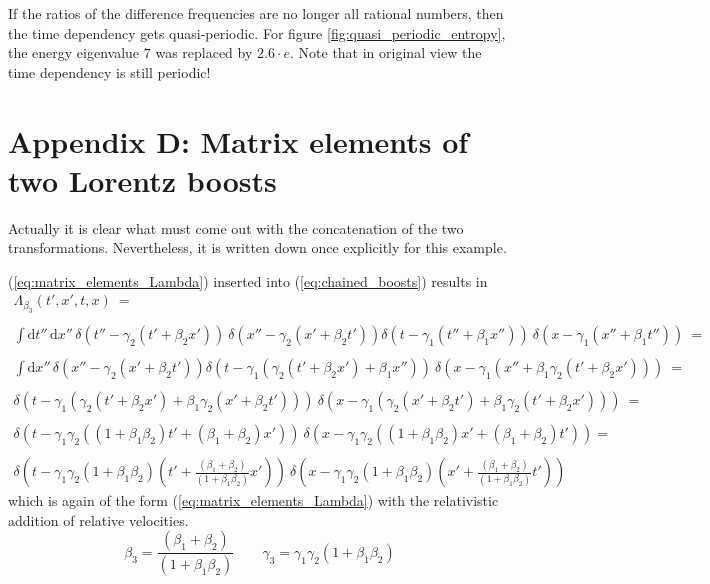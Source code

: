 \documentclass[12pt]{article}
\begin{document}
If the ratios of the difference frequencies are no longer all rational numbers, then the time dependency gets quasi-periodic. For figure \ref{fig:quasi_periodic_entropy}, the energy eigenvalue $7$ was replaced by $2.6 \cdot e$. Note that in original view the time dependency is still periodic!

\newpage
\section{Appendix D: Matrix elements of two Lorentz boosts}

Actually it is clear what must come out with the concatenation of the two transformations. Nevertheless, it is written down once explicitly for this example.

(\ref{eq:matrix_elements_Lambda}) inserted into (\ref{eq:chained_boosts}) results in
\begin{equation*}
\begin{gathered}
\Lambda_{\beta_3}(t',x',t,x)\ = 
\\ \\
\int \mathrm{d}t''\,\mathrm{d}x''\,
\delta(t''-\gamma_2(t'+\beta_2 x'))\ \delta(x''-\gamma_2(x'+\beta_2 t'))
\delta(t-\gamma_1(t''+\beta_1 x''))\ \delta(x-\gamma_1(x''+\beta_1 t''))\ =
\\ \\
\int \mathrm{d}x''\,
\delta(x''-\gamma_2(x'+\beta_2 t'))
\delta(t-\gamma_1(\gamma_2(t'+\beta_2 x')+\beta_1 x''))\ \delta(x-\gamma_1(x''+\beta_1 \gamma_2(t'+\beta_2 x')))\ =
\\ \\
\delta(t-\gamma_1(\gamma_2(t'+\beta_2 x')+\beta_1 \gamma_2(x'+\beta_2 t')))\ \delta(x-\gamma_1(\gamma_2(x'+\beta_2 t')+\beta_1 \gamma_2(t'+\beta_2 x')))\ =
\\ \\
\delta(t-\gamma_1\gamma_2((1+\beta_1\beta_2)t'+(\beta_1+\beta_2)x'))\ 
\delta(x-\gamma_1\gamma_2((1+\beta_1\beta_2)x'+(\beta_1+\beta_2)t'))
=
\\ \\
\delta\left(t-\gamma_1\gamma_2(1+\beta_1\beta_2)(t'+\frac{(\beta_1+\beta_2)}{(1+\beta_1\beta_2)}x')\right)\ 
\delta\left(x-\gamma_1\gamma_2(1+\beta_1\beta_2)(x'+\frac{(\beta_1+\beta_2)}{(1+\beta_1\beta_2)}t')\right)
\end{gathered}
\end{equation*}
which is again of the form (\ref{eq:matrix_elements_Lambda}) with the relativistic addition of relative velocities.
\begin{equation*}
\beta_3 = \frac{(\beta_1+\beta_2)}{(1+\beta_1\beta_2)} \quad \quad
\gamma_3 = \gamma_1 \gamma_2(1+\beta_1\beta_2) 
\end{equation*}
\end{document}
